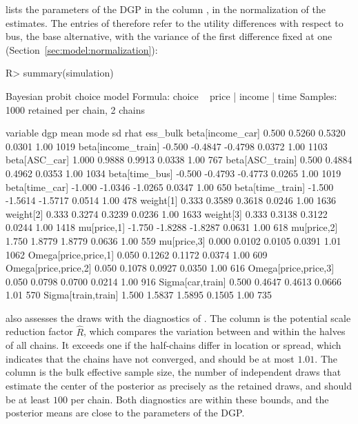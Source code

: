 \documentclass[article,shortnames]{jss}
\newcommand{\fct}[1]{\code{#1()}}
\begin{document}
%
\fct{summary} lists the parameters of the DGP in the column , in the
normalization of the estimates. The entries of  therefore refer to
the utility differences with respect to bus, the base alternative, with the
variance of the first difference fixed at one
(Section~\ref{sec:model:normalization}):
%
\begin{Schunk}
\begin{Sinput}
R> summary(simulation)
\end{Sinput}
\begin{Soutput}
Bayesian probit choice model
Formula: choice ~ price | income | time 
Samples: 1000 retained per chain, 2 chains

             variable    dgp    mean    mode     sd rhat ess_bulk
     beta[income_car]  0.500  0.5260  0.5320 0.0301 1.00     1019
   beta[income_train] -0.500 -0.4847 -0.4798 0.0372 1.00     1103
        beta[ASC_car]  1.000  0.9888  0.9913 0.0338 1.00      767
      beta[ASC_train]  0.500  0.4884  0.4962 0.0353 1.00     1034
       beta[time_bus] -0.500 -0.4793 -0.4773 0.0265 1.00     1019
       beta[time_car] -1.000 -1.0346 -1.0265 0.0347 1.00      650
     beta[time_train] -1.500 -1.5614 -1.5717 0.0514 1.00      478
            weight[1]  0.333  0.3589  0.3618 0.0246 1.00     1636
            weight[2]  0.333  0.3274  0.3239 0.0236 1.00     1633
            weight[3]  0.333  0.3138  0.3122 0.0244 1.00     1418
          mu[price,1] -1.750 -1.8288 -1.8287 0.0631 1.00      618
          mu[price,2]  1.750  1.8779  1.8779 0.0636 1.00      559
          mu[price,3]  0.000  0.0102  0.0105 0.0391 1.01     1062
 Omega[price,price,1]  0.050  0.1262  0.1172 0.0374 1.00      609
 Omega[price,price,2]  0.050  0.1078  0.0927 0.0350 1.00      616
 Omega[price,price,3]  0.050  0.0798  0.0700 0.0214 1.00      916
     Sigma[car,train]  0.500  0.4647  0.4613 0.0666 1.01      570
   Sigma[train,train]  1.500  1.5837  1.5895 0.1505 1.00      735
\end{Soutput}
\end{Schunk}
%
\fct{summary} also assesses the draws with the diagnostics of
\citet{Vehtari2021}. The column  is the potential scale reduction
factor $\hat{R}$, which compares the variation between and within the halves of
all chains. It exceeds one if the half-chains differ in location or spread,
which indicates that the chains have not converged, and should be at most
$1.01$. The column  is the bulk effective sample size, the number
of independent draws that estimate the center of the posterior as precisely as
the retained draws, and should be at least $100$ per chain. Both diagnostics are
within these bounds, and the posterior means are close to the parameters of the
DGP.
\end{document}
